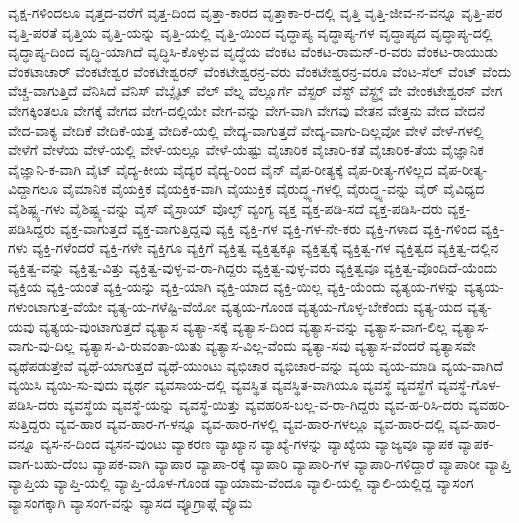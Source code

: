 {ವೃಕ್ಷ-ಗಳಿಂದಲೂ
ವೃತ್ತದ-ವರೆಗೆ
ವೃತ್ತ-ದಿಂದ
ವೃತ್ತಾ-ಕಾರದ
ವೃತ್ತಾಕಾ-ರ-ದಲ್ಲಿ
ವೃತ್ತಿ
ವೃತ್ತಿ-ಜೀವ-ನ-ವನ್ನೂ
ವೃತ್ತಿ-ಪರ
ವೃತ್ತಿ-ಪರತೆ
ವೃತ್ತಿಯ
ವೃತ್ತಿ-ಯನ್ನು
ವೃತ್ತಿ-ಯಲ್ಲಿ
ವೃತ್ತಿ-ಯಿಂದ
ವೃದ್ಧಾಪ್ಯ
ವೃದ್ಧಾಪ್ಯ-ಗಳ
ವೃದ್ಧಾಪ್ಯದ
ವೃದ್ಧಾಪ್ಯ-ದಲ್ಲಿ
ವೃದ್ಧಾಪ್ಯ-ದಿಂದ
ವೃದ್ಧಿ-ಯಾಗಿದೆ
ವೃದ್ಧಿಸಿ-ಕೊಳ್ಳುವ
ವೃದ್ಧೆಯ
ವೆಂಕಟ
ವೆಂಕಟ-ರಾಮನ್-ರ-ವರು
ವೆಂಕಟ-ರಾಯುಡು
ವೆಂಕಟಾಚಾರ್
ವೆಂಕಟೇಶ್ವರ
ವೆಂಕಟೇಶ್ವರನ್
ವೆಂಕಟೇಶ್ವರನ್ರ-ವರು
ವೆಂಕಟೇಶ್ವರನ್ರ-ವರೂ
ವೆಂಟ-ಸೆಲ್
ವೆಂಟ್
ವೆಂದು
ವೆಚ್ಚ-ವಾಗುತ್ತಿದೆ
ವೆನಿಸಿದೆ
ವೆನಿಸ್
ವೆಬ್ಸೈಟ್
ವೆಲ್
ವೆಲ್ನ
ವೆಲ್ಲೂರ್ಗೆ
ವೆಸ್ಟರ್
ವೆಸ್ಟ್
ವೆಸ್ಟ್ರ್ನ್
ವೇ
ವೇಂಕಟೇಶ್ವರನ್
ವೇಗ
ವೇಗಕ್ಕಿಂತಲೂ
ವೇಗಕ್ಕೆ
ವೇಗದ
ವೇಗ-ದಲ್ಲಿಯೇ
ವೇಗ-ವನ್ನು
ವೇಗ-ವಾಗಿ
ವೇಗವು
ವೇತನ
ವೇತ್ತನು
ವೇದ
ವೇದನೆ
ವೇದ-ವಾಕ್ಯ
ವೇದಿಕೆ
ವೇದಿಕೆ-ಯತ್ತ
ವೇದಿಕೆ-ಯಲ್ಲಿ
ವೇದ್ಯ-ವಾಗುತ್ತದೆ
ವೇದ್ಯ-ವಾಗು-ದಿಲ್ಲವೋ
ವೇಳೆ
ವೇಳೆ-ಗಳಲ್ಲಿ
ವೇಳೆಗೆ
ವೇಳೆಯ
ವೇಳೆ-ಯಲ್ಲಿ
ವೇಳೆ-ಯಲ್ಲೂ
ವೇಳೆ-ಯೆಷ್ಟು
ವೈಚಾರಿಕ
ವೈಚಾರಿ-ಕತೆ
ವೈಚಾರಿಕ-ತೆಯ
ವೈಜ್ಞಾನಿಕ
ವೈಜ್ಞಾನಿ-ಕ-ವಾಗಿ
ವೈಟ್
ವೈದ್ಯ-ಕೀಯ
ವೈದ್ಯರ
ವೈದ್ಯ-ರಿಂದ
ವೈನ್
ವೈಪ-ರೀತ್ಯಕ್ಕೆ
ವೈಪ-ರೀತ್ಯ-ಗಳಿಲ್ಲದ
ವೈಪ-ರೀತ್ಯ-ವಿದ್ದಾಗಲೂ
ವೈಮಾನಿಕ
ವೈಯಕ್ತಿಕ
ವೈಯಕ್ತಿಕ-ವಾಗಿ
ವೈಯುಕ್ತಿಕ
ವೈರುದ್ಧ್ಯ-ಗಳಲ್ಲಿ
ವೈರುದ್ಧ್ಯ-ವನ್ನು
ವೈರ್
ವೈವಿಧ್ಯದ
ವೈಶಿಷ್ಟ್ಯ-ಗಳು
ವೈಶಿಷ್ಟ್ಯ-ವನ್ನು
ವೈಸ್
ವೈಸ್ರಾಯ್
ವೊಲ್ಛ್
ವ್ಯಂಗ್ಯ
ವ್ಯಕ್ತ
ವ್ಯಕ್ತ-ಪಡಿ-ಸದೆ
ವ್ಯಕ್ತ-ಪಡಿಸಿ-ದರು
ವ್ಯಕ್ತ-ಪಡಿಸಿದ್ದರು
ವ್ಯಕ್ತ-ವಾಗುತ್ತದೆ
ವ್ಯಕ್ತ-ವಾಗುತ್ತಿದ್ದವು
ವ್ಯಕ್ತಿ
ವ್ಯಕ್ತಿ-ಗಳ
ವ್ಯಕ್ತಿ-ಗಳ-ನೇ-ಕರು
ವ್ಯಕ್ತಿ-ಗಳಾದ
ವ್ಯಕ್ತಿ-ಗಳಿಂದ
ವ್ಯಕ್ತಿ-ಗಳು
ವ್ಯಕ್ತಿ-ಗಳೆಂದರೆ
ವ್ಯಕ್ತಿ-ಗಳೇ
ವ್ಯಕ್ತಿಗೂ
ವ್ಯಕ್ತಿಗೆ
ವ್ಯಕ್ತಿತ್ವ
ವ್ಯಕ್ತಿತ್ವಕ್ಕೂ
ವ್ಯಕ್ತಿತ್ವಕ್ಕೆ
ವ್ಯಕ್ತಿತ್ವ-ಗಳ
ವ್ಯಕ್ತಿತ್ವದ
ವ್ಯಕ್ತಿತ್ವ-ದಲ್ಲಿನ
ವ್ಯಕ್ತಿತ್ವ-ವನ್ನು
ವ್ಯಕ್ತಿತ್ವ-ವಿತ್ತು
ವ್ಯಕ್ತಿತ್ವ-ವುಳ್ಳ-ವ-ರಾ-ಗಿದ್ದರು
ವ್ಯಕ್ತಿತ್ವ-ವುಳ್ಳ-ವರು
ವ್ಯಕ್ತಿತ್ವವೂ
ವ್ಯಕ್ತಿತ್ವ-ವೊಂದಿದೆ-ಯೆಂದು
ವ್ಯಕ್ತಿಯ
ವ್ಯಕ್ತಿ-ಯಂತೆ
ವ್ಯಕ್ತಿ-ಯನ್ನು
ವ್ಯಕ್ತಿ-ಯಾಗಿ
ವ್ಯಕ್ತಿ-ಯಾದ
ವ್ಯಕ್ತಿ-ಯಿಲ್ಲ
ವ್ಯಕ್ತಿ-ಯೆಂದು
ವ್ಯತ್ಯಯ-ಗಳನ್ನು
ವ್ಯತ್ಯಯ-ಗಳುಂಟಾಗುತ್ತ-ವೆಯೇ
ವ್ಯತ್ಯ-ಯ-ಗಳೆಷ್ಟಿ-ವೆಯೋ
ವ್ಯತ್ಯಯ-ಗೊಂಡ
ವ್ಯತ್ಯಯ-ಗೊಳ್ಳ-ಬೇಕೆಂದು
ವ್ಯತ್ಯ-ಯದ
ವ್ಯತ್ಯ-ಯವು
ವ್ಯತ್ಯಯ-ವುಂಟಾಗುತ್ತದೆ
ವ್ಯತ್ಯಾಸ
ವ್ಯತ್ಯಾ-ಸಕ್ಕೆ
ವ್ಯತ್ಯಾಸ-ದಿಂದ
ವ್ಯತ್ಯಾಸ-ವನ್ನು
ವ್ಯತ್ಯಾಸ-ವಾಗ-ಲಿಲ್ಲ
ವ್ಯತ್ಯಾಸ-ವಾಗು-ವು-ದಿಲ್ಲ
ವ್ಯತ್ಯಾಸ-ವಿ-ರುವಂತಾ-ಯಿತು
ವ್ಯತ್ಯಾಸ-ವಿಲ್ಲ-ವೆಂದು
ವ್ಯತ್ಯಾ-ಸವು
ವ್ಯತ್ಯಾಸ-ವೆಂದರೆ
ವ್ಯತ್ಯಾಸವೇ
ವ್ಯಥೆಪಡುತ್ತೇವೆ
ವ್ಯಥೆ-ಯಾಗುತ್ತದೆ
ವ್ಯಥೆ-ಯುಂಟು
ವ್ಯಭಿಚಾರ
ವ್ಯಭಿಚಾರ-ವನ್ನು
ವ್ಯಯ
ವ್ಯಯ-ಮಾಡಿ
ವ್ಯಯ-ವಾಗಿದೆ
ವ್ಯಯಿಸಿ
ವ್ಯಯಿ-ಸು-ವುದು
ವ್ಯರ್ಥ
ವ್ಯವಸಾಯ-ದಲ್ಲಿ
ವ್ಯವಸ್ಥಿತ
ವ್ಯವಸ್ಥಿತ-ವಾಗಿಯೂ
ವ್ಯವಸ್ಥೆ
ವ್ಯವಸ್ಥೆಗೆ
ವ್ಯವಸ್ಥೆ-ಗೊಳ-ಪಡಿಸಿ-ದರು
ವ್ಯವಸ್ಥೆಯ
ವ್ಯವಸ್ಥೆ-ಯನ್ನು
ವ್ಯವಸ್ಥೆ-ಯಿತ್ತು
ವ್ಯವಹರಿಸ-ಬಲ್ಲ-ವ-ರಾ-ಗಿದ್ದರು
ವ್ಯವ-ಹ-ರಿಸಿ-ದರು
ವ್ಯವಹರಿ-ಸುತ್ತಿದ್ದರು
ವ್ಯವ-ಹಾರ
ವ್ಯವ-ಹಾರ-ಗ-ಳನ್ನೂ
ವ್ಯವ-ಹಾರ-ಗಳಲ್ಲಿ
ವ್ಯವ-ಹಾರ-ಗಳಲ್ಲೂ
ವ್ಯವ-ಹಾರ-ದಲ್ಲಿ
ವ್ಯವ-ಹಾರ-ವನ್ನೂ
ವ್ಯಸ-ನ-ದಿಂದ
ವ್ಯಸನ-ವುಂಟು
ವ್ಯಾಕರಣ
ವ್ಯಾಖ್ಯಾನ
ವ್ಯಾಖ್ಯೆ-ಗಳನ್ನು
ವ್ಯಾಖ್ಯೆಯ
ವ್ಯಾಜ್ಯವೂ
ವ್ಯಾಪಕ
ವ್ಯಾಪಕ-ವಾಗ-ಬಹು-ದೆಂಬ
ವ್ಯಾಪಕ-ವಾಗಿ
ವ್ಯಾಪಾರ
ವ್ಯಾಪಾ-ರಕ್ಕೆ
ವ್ಯಾಪಾರಿ
ವ್ಯಾಪಾರಿ-ಗಳ
ವ್ಯಾಪಾರಿ-ಗಳಿದ್ದಾರೆ
ವ್ಯಾಪಾರೀ
ವ್ಯಾಪ್ತಿ
ವ್ಯಾಪ್ತಿಯ
ವ್ಯಾಪ್ತಿ-ಯಲ್ಲಿ
ವ್ಯಾಪ್ತಿ-ಯೊಳ-ಗೊಂಡ
ವ್ಯಾಯಾಮ-ವೆಂದೂ
ವ್ಯಾಲಿ-ಯಲ್ಲಿ
ವ್ಯಾಲಿ-ಯಲ್ಲಿದ್ದ
ವ್ಯಾಸಂಗ
ವ್ಯಾಸಂಗಕ್ಕಾಗಿ
ವ್ಯಾಸಂಗ-ವನ್ನು
ವ್ಯಾಸದ
ವ್ಯೂಗ್ರಾಫ್ಗೆ
ವ್ಯೊಮ
}
